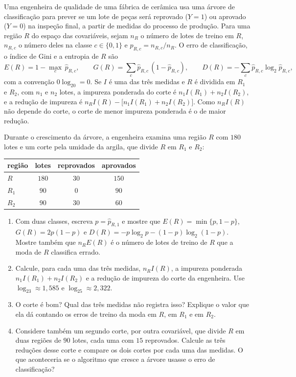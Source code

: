 \documentclass[11pt,a4paper]{article}
\begin{document}

\begin{exercicio}
Uma engenheira de qualidade de uma fábrica de cerâmica usa uma árvore de
classificação para prever se um lote de peças será reprovado ($Y=1$) ou aprovado
($Y=0$) na inspeção final, a partir de medidas do processo de produção. Para uma região $R$ do espaço das covariáveis, sejam $n_R$ o número
de lotes de treino em $R$, $n_{R,c}$ o número deles na classe $c\in\{0,1\}$ e
$\widehat p_{R,c}=n_{R,c}/n_R$. O erro de classificação, o índice de Gini e a
entropia de $R$ são
\[
  E(R)=1-\max_{c}\,\widehat p_{R,c},\qquad
  G(R)=\sum_{c}\widehat p_{R,c}\,(1-\widehat p_{R,c}),\qquad
  D(R)=-\sum_{c}\widehat p_{R,c}\log_2\widehat p_{R,c},
\]
com a convenção $0\log_20=0$. Se $I$ é uma das três medidas e $R$ é dividida em $R_1$
e $R_2$, com $n_1$ e $n_2$ lotes, a impureza ponderada do corte é
$n_1I(R_1)+n_2I(R_2)$, e a redução de impureza é
$n_RI(R)-\big[n_1I(R_1)+n_2I(R_2)\big]$. Como $n_RI(R)$ não depende do corte, o corte
de menor impureza ponderada é o de maior redução.

Durante o crescimento da árvore, a engenheira examina uma região $R$ com $180$ lotes e
um corte pela umidade da argila, que divide $R$ em $R_1$ e $R_2$:
\begin{center}\small
\renewcommand{\arraystretch}{1.25}
\begin{tabular}{@{}lccc@{}}
\toprule
região & lotes & reprovados & aprovados \\
\midrule
$R$   & $180$ & $30$ & $150$ \\
$R_1$ & $90$  & $0$  & $90$ \\
$R_2$ & $90$  & $30$ & $60$ \\
\bottomrule
\end{tabular}
\end{center}
\begin{enumerate}[label=(\alph*),leftmargin=1.1cm]
  \item Com duas classes, escreva $p=\widehat p_{R,1}$ e mostre que
        $E(R)=\min\{p,1-p\}$, $G(R)=2p(1-p)$ e
        $D(R)=-p\log_2p-(1-p)\log_2(1-p)$. Mostre também que $n_RE(R)$ é o número de
        lotes de treino de $R$ que a moda de $R$ classifica errado.
  \item Calcule, para cada uma das três medidas, $n_RI(R)$, a impureza ponderada
        $n_1I(R_1)+n_2I(R_2)$ e a redução de impureza do corte da engenheira. Use
        $\log_23\approx1{,}585$ e $\log_25\approx2{,}322$.
  \item O corte é bom? Qual das três medidas não registra isso? Explique o valor que
        ela dá contando os erros de treino da moda em $R$, em $R_1$ e em $R_2$.
  \item Considere também um segundo corte, por outra covariável, que divide $R$ em duas
        regiões de $90$ lotes, cada uma com $15$ reprovados. Calcule as três reduções
        desse corte e compare os dois cortes por cada uma das medidas. O que
        aconteceria se o algoritmo que cresce a árvore usasse o erro de classificação?
\end{enumerate}
\end{exercicio}
\end{document}
